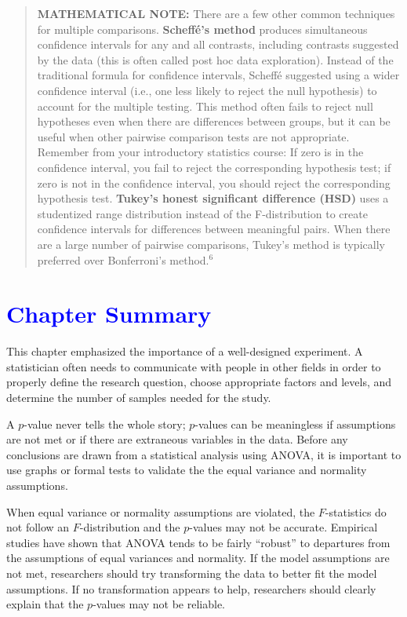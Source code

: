 \documentclass[
]{report}
\begin{document}
\begin{quote}
\textbf{MATHEMATICAL NOTE:} There are a few other common techniques for multiple comparisons. \textbf{Scheffé's method} produces simultaneous confidence intervals for any and all contrasts, including contrasts suggested by the data (this is often called post hoc data exploration). Instead of the traditional formula for confidence intervals, Scheffé suggested using a wider confidence interval (i.e., one less likely to reject the null hypothesis) to account for the multiple testing. This method often fails to reject null hypotheses even when there are differences between groups, but it can be useful when other pairwise comparison tests are not appropriate. Remember from your introductory statistics course: If zero is in the confidence interval, you fail to reject the corresponding hypothesis test; if zero is not in the confidence interval, you should reject the corresponding hypothesis test. \textbf{Tukey's honest significant difference (HSD)} uses a studentized range distribution instead of the F-distribution to create confidence intervals for differences between meaningful pairs. When there are a large number of pairwise comparisons, Tukey's method is typically preferred over Bonferroni's method.\(^6\)
\end{quote}

\hypertarget{section-47}{%
\section{\texorpdfstring{\textcolor{blue}{Chapter Summary}}{}}\label{section-47}}

This chapter emphasized the importance of a well-designed experiment. A statistician often needs to communicate with people in other fields in order to properly define the research question, choose appropriate factors and levels, and determine the number of samples needed for the study.

A \(\scriptstyle p\)-value never tells the whole story; \(\scriptstyle p\)-values can be meaningless if assumptions are not met or if there are extraneous variables in the data. Before any conclusions are drawn from a statistical analysis using ANOVA, it is important to use graphs or formal tests to validate the the equal variance and normality assumptions.

When equal variance or normality assumptions are violated, the \(\scriptstyle F\)-statistics do not follow an \(\scriptstyle F\)-distribution and the \(\scriptstyle p\)-values may not be accurate. Empirical studies have shown that ANOVA tends to be fairly ``robust'' to departures from the assumptions of equal variances and normality. If the model assumptions are not met, researchers should try transforming the data to better fit the model assumptions. If no transformation appears to help, researchers should clearly explain that the \(\scriptstyle p\)-values may not be reliable.
\end{document}

